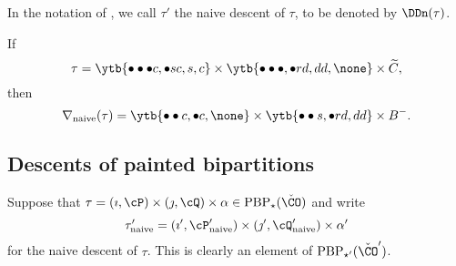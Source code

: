 \documentclass[ssunip]{subfiles}
\begin{document}
 In the notation of , we call $\tau'$ the naive descent of $\tau$, to be denoted by $\DDn(\tau)$.  
 

  

  
 \begin{Example} If
    \[
     \tau = \ytb{\bullet\bullet\bullet {c},\bullet {s} {c},{s},{c}}
    \times \ytb{\bullet\bullet\bullet ,\bullet {r} {d},{d}{d}, \none}
    \times \widetilde C, \]
   then 
   \[
    \nabla_{\mathrm{naive}}(\tau) =\ytb{\bullet\bullet{c} ,\bullet{c},\none }
    \times  \ytb{\bullet\bullet {s} ,\bullet {r} {d},{d}{d}}\times B^-.
    \]
    
\end{Example}
 
  \subsection{Descents of painted bipartitions}\label{sec:desc}
 

Suppose that 
$
\tau=(\imath,\cP)\times(\jmath,\cQ)\times \alpha \in  \mathrm{PBP}_\star(\check \CO)
$
and write 
\[
  \tau'_{\mathrm{naive}}=(\imath', \cP'_{\mathrm{naive}})\times (\jmath', \cQ'_{\mathrm{naive}})\times \alpha'
\]
for the naive descent of $\tau$. This is clearly an element of $  \mathrm{PBP}_{\star'}(\check \CO')$. 
\end{document}
